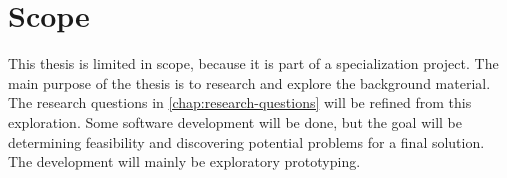 \section{Scope}

This thesis is limited in scope, because it is part of a specialization project.
The main purpose of the thesis is to research and explore the background material. The research questions in \cref{chap:research-questions} will be refined from this exploration.
Some software development will be done, but the goal will be determining feasibility and discovering potential problems for a final solution.
The development will mainly be exploratory prototyping.

